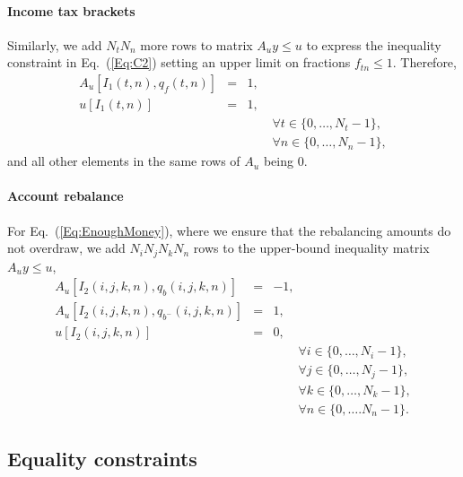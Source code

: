 \documentclass{report}[fleqn,12pt]
\begin{document}
\paragraph*{Income tax brackets}
Similarly, we add $N_t N_n$ more rows to matrix $A_uy \le u$ to express
the inequality constraint in Eq.~(\ref{Eq:C2})
setting an upper limit on fractions $f_{t n} \le 1$. Therefore,
\begin{eqnarray}
	A_u[I_1(t, n), q_f(t, n)] &=& 1, \nonumber \\
	u[I_1(t, n)] &=& 1,\\
	&&\qquad\forall t \in \{0,\ldots, N_t-1\}, \nonumber\\
	&&\qquad\forall n \in \{0,\ldots, N_n -1\},\nonumber
\end{eqnarray}
and all other elements in the same rows of $A_u$ being $0$.

\paragraph*{Account rebalance}
For Eq.~(\ref{Eq:EnoughMoney}), where we ensure that the
rebalancing amounts do not overdraw, we add $N_iN_jN_kN_n$ rows to the upper-bound
inequality matrix $A_uy\le u$,
\begin{eqnarray}
	A_u[I_2(i, j, k, n), q_{b}(i, j, k, n)] &=& -1, \nonumber \\
	A_u[I_2(i, j, k, n), q_{b^-}(i, j, k, n)] &=& 1, \nonumber \\
	u[I_2(i, j, k, n)] &=& 0, \\
	&&\qquad\forall i \in \{0,\ldots, N_i-1\},\nonumber\\
	&&\qquad\forall j \in \{0,\ldots, N_j-1\},\nonumber\\
	&&\qquad\forall k \in \{0,\ldots, N_k-1\},\nonumber\\
	&&\qquad\forall n \in \{0,\ldots. N_n-1\}. \nonumber
\end{eqnarray}

\subsection{Equality constraints}
\end{document}
